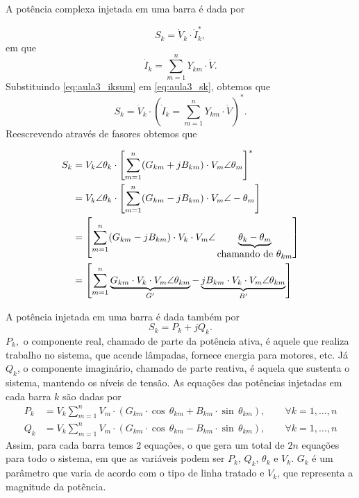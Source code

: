 A potência complexa injetada em uma barra é dada por 

\begin{equation}
S_{k}=\dot{V}_{k}\cdot\dot{I}_{k}^{*},\label{eq:aula3_sk}
\end{equation}
em que 
\begin{equation}
\dot{I}_{k}=\sum_{m=1}^{n}Y_{km}\cdot\dot{V}.\label{eq:aula3_iksum}
\end{equation}
Substituindo \ref{eq:aula3_iksum} em \ref{eq:aula3_sk}, obtemos
que 
\[
S_{k}=\dot{V}_{k}\cdot\left(\dot{I}_{k}=\sum_{m=1}^{n}Y_{km}\cdot\dot{V}\right)^{*}.
\]
Reescrevendo através de fasores obtemos que

\[
\begin{aligned}S_{k} & =V_{k}\angle\theta_{k}\cdot\left[\sum_{m=1}^{n}(G_{km}+jB_{km})\cdot V_{m}\angle\theta_{m}\right]^{*}\\
 & =V_{k}\angle\theta_{k}\cdot\left[\sum_{m=1}^{n}(G_{km}-jB_{km})\cdot V_{m}\angle-\theta_{m}\right]\\
 & =\left[\sum_{m=1}^{n}(G_{km}-jB_{km})\cdot V_{k}\cdot V_{m}\angle\underbrace{\theta_{k}-\theta_{m}}_{\mbox{chamando de \ensuremath{\theta_{km}}}}\right]\\
 & =\left[\sum_{m=1}^{n}\underbrace{G_{km}\cdot V_{k}\cdot V_{m}\angle\theta_{km}}_{G'}-\underbrace{jB_{km}\cdot V_{k}\cdot V_{m}\angle\theta_{km}}_{B'}\right]
\end{aligned}
\]

A potência injetada em uma barra é dada também por 
\[
S_{k}=P_{k}+jQ_{k}.
\]
$P_{k},$ o componente real, chamado de parte da potência ativa, é
aquele que realiza trabalho no sistema, que acende lâmpadas, fornece
energia para motores, etc. Já $Q_{k}$, o componente imaginário, chamado
de parte reativa, é aquela que sustenta o sistema, mantendo os níveis
de tensão. As equações das potências injetadas em cada barra $k$
são dadas por
\[
\begin{aligned}P_{k} & =V_{k}\sum_{m=1}^{n}V_{m}\cdot(G_{km}\cdot\cos\,\theta_{km}+B_{km}\cdot\sin\,\theta_{km}),\qquad\forall k=1,\dots,n\\
Q_{k} & =V_{k}\sum_{m=1}^{n}V_{m}\cdot(G_{km}\cdot\cos\,\theta_{km}-B_{km}\cdot\sin\,\theta_{km}),\qquad\forall k=1,\dots,n
\end{aligned}
\]
Assim, para cada barra temos 2 equações, o que gera um total de $2n$
equações para todo o sistema, em que as variáveis podem ser $P_{k}$,
$Q_{k}$, $\theta_{k}$ e $V_{k}$. $G_{k}$ é um parâmetro que varia
de acordo com o tipo de linha tratado e $V_{k}$, que representa a
magnitude da potência.%

